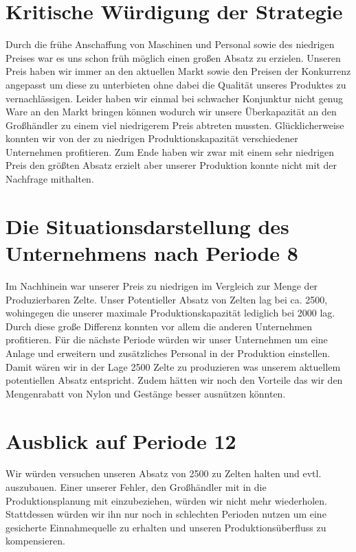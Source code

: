 \documentclass[a4paper, 12pt]{article}
\begin{document}
\begin{flushleft}
\section{Kritische Würdigung der Strategie}
Durch die frühe Anschaffung von Maschinen und Personal sowie des niedrigen Preises war es uns schon früh möglich einen großen Absatz zu erzielen.
Unseren Preis haben wir immer an den aktuellen Markt sowie den Preisen der Konkurrenz angepasst um diese zu unterbieten ohne dabei die Qualität unseres Produktes zu vernachlässigen.
Leider haben wir einmal bei schwacher Konjunktur nicht genug Ware an den Markt bringen können wodurch wir unsere Überkapazität an den Großhändler zu einem viel niedrigerem Preis abtreten mussten.
Glücklicherweise konnten wir von der zu niedrigen Produktionskapazität verschiedener Unternehmen profitieren.
Zum Ende haben wir zwar mit einem sehr niedrigen Preis den größten Absatz erzielt aber unserer Produktion konnte nicht mit der Nachfrage mithalten.

\section{Die Situationsdarstellung des Unternehmens nach Periode 8}  
Im Nachhinein war unserer Preis zu niedrigen im Vergleich zur Menge der Produzierbaren Zelte.
Unser Potentieller Absatz von Zelten lag bei ca. 2500, wohingegen die unserer maximale Produktionskapazität lediglich bei 2000 lag.
Durch diese große Differenz konnten vor allem die anderen Unternehmen profitieren.
Für die nächste Periode würden wir unser Unternehmen um eine Anlage und erweitern und zusätzliches Personal in der Produktion einstellen.
Damit wären wir in der Lage 2500 Zelte zu produzieren was unserem aktuellem potentiellen Absatz entspricht.
Zudem hätten wir noch den Vorteile das wir den Mengenrabatt von Nylon und Gestänge besser ausnützen könnten.

\section{Ausblick auf Periode 12}
Wir würden versuchen unseren Absatz von 2500 zu Zelten halten und evtl. auszubauen.
Einer unserer Fehler, den Großhändler mit in die Produktionsplanung mit einzubeziehen, würden wir nicht mehr wiederholen.
Stattdessen würden wir ihn nur noch in schlechten Perioden nutzen um eine gesicherte Einnahmequelle zu erhalten und unseren Produktionsüberfluss zu kompensieren.



\end{flushleft}
\end{document}
